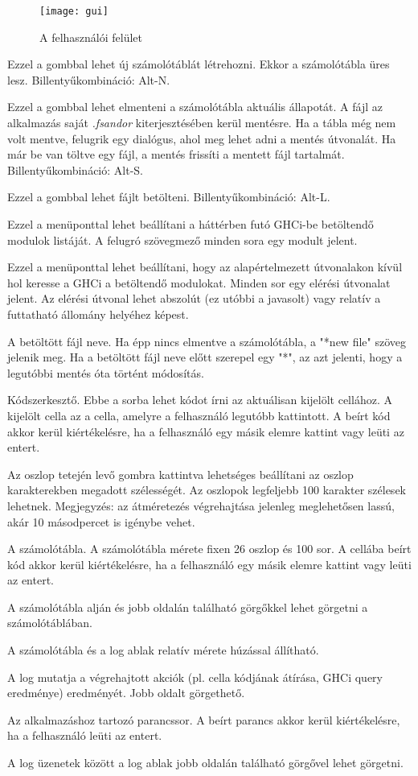 \begin{figure}[H]
	\centering
	\texttt{[image: gui]}
	\caption{A felhasználói felület}
	\label{fig:gui}
\end{figure}

\begin{compactenum}
	\item Ezzel a gombbal lehet új számolótáblát létrehozni. Ekkor a számolótábla üres lesz. Billentyűkombináció: Alt-N.
	\item Ezzel a gombbal lehet elmenteni a számolótábla aktuális állapotát. A fájl az alkalmazás saját \textit{.fsandor} kiterjesztésében kerül mentésre. Ha a tábla még nem volt mentve, felugrik egy dialógus, ahol meg lehet adni a mentés útvonalát. Ha már be van töltve egy fájl, a mentés frissíti a mentett fájl tartalmát. Billentyűkombináció: Alt-S.
	\item Ezzel a gombbal lehet fájlt betölteni. Billentyűkombináció: Alt-L.
	\item Ezzel a menüponttal lehet beállítani a háttérben futó GHCi-be betöltendő modulok listáját. A felugró szövegmező minden sora egy modult jelent.
	\item Ezzel a menüponttal lehet beállítani, hogy az alapértelmezett útvonalakon kívül hol keresse a GHCi a betöltendő modulokat. Minden sor egy elérési útvonalat jelent. Az elérési útvonal lehet abszolút (ez utóbbi a javasolt) vagy relatív a futtatható állomány helyéhez képest.
	\item A betöltött fájl neve. Ha épp nincs elmentve a számolótábla, a "*new file" szöveg jelenik meg. Ha a betöltött fájl neve előtt szerepel egy "*", az azt jelenti, hogy a legutóbbi mentés óta történt módosítás.
	\item Kódszerkesztő. Ebbe a sorba lehet kódot írni az aktuálisan kijelölt cellához. A kijelölt cella az a cella, amelyre a felhasználó legutóbb kattintott. A beírt kód akkor kerül kiértékelésre, ha a felhasználó egy másik elemre kattint vagy leüti az entert.
	\item Az oszlop tetején levő gombra kattintva lehetséges beállítani az oszlop karakterekben megadott szélességét. Az oszlopok legfeljebb 100 karakter szélesek lehetnek. Megjegyzés: az átméretezés végrehajtása jelenleg meglehetősen lassú, akár 10 másodpercet is igénybe vehet.
	\item A számolótábla. A számolótábla mérete fixen 26 oszlop és 100 sor. A cellába beírt kód akkor kerül kiértékelésre, ha a felhasználó egy másik elemre kattint vagy leüti az entert.
	\item A számolótábla alján és jobb oldalán található görgőkkel lehet görgetni a számolótáblában.
	\item A számolótábla és a log ablak relatív mérete húzással állítható. 
	\item A log mutatja a végrehajtott akciók (pl. cella kódjának átírása, GHCi query eredménye) eredményét. Jobb oldalt görgethető.
	\item Az alkalmazáshoz tartozó parancssor. A beírt parancs akkor kerül kiértékelésre, ha a felhasználó leüti az entert.
	\item A log üzenetek között a log ablak jobb oldalán található görgővel lehet görgetni.
\end{compactenum}

